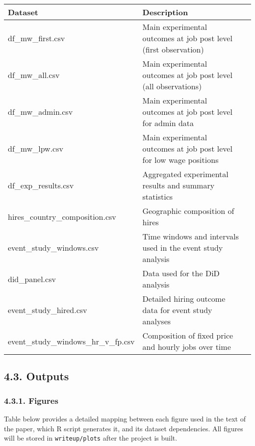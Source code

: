 \documentclass[10pt]{article}
\newenvironment{eightpt}{\begingroup\fontsize{8}{13}\selectfont}{\endgroup}
\begin{document}
\begin{eightpt}
\begin{tabularx}{\textwidth}{T@{}p{0.5\textwidth}p{0.5\textwidth}@{}}
\toprule
Dataset & Description \\
\midrule
{df\_mw\_first.csv} & Main experimental outcomes at job post level (first observation) \\
{df\_mw\_all.csv} & Main experimental outcomes at job post level (all observations) \\
{df\_mw\_admin.csv} & Main experimental outcomes at job post level for admin data \\
{df\_mw\_lpw.csv} & Main experimental outcomes at job post level for low wage positions \\
{df\_exp\_results.csv} & Aggregated experimental results and summary statistics \\
{hires\_country\_composition.csv} & Geographic composition of hires \\
{event\_study\_windows.csv} & Time windows and intervals used in the event study analysis \\
{did\_panel.csv} & Data used for the DiD analysis \\
{event\_study\_hired.csv} & Detailed hiring outcome data for event study analyses \\
{event\_study\_windows\_hr\_v\_fp.csv} & Composition of fixed price and hourly jobs over time \\
\bottomrule
\end{tabularx}
\end{eightpt}


\subsection*{4.3. Outputs}

\subsubsection*{4.3.1. Figures}

Table below provides a detailed mapping between each figure used in the text of the paper, which R script generates it, and its dataset dependencies. 
All figures will be stored in \texttt{writeup/plots} after the project is built.
\end{document}
